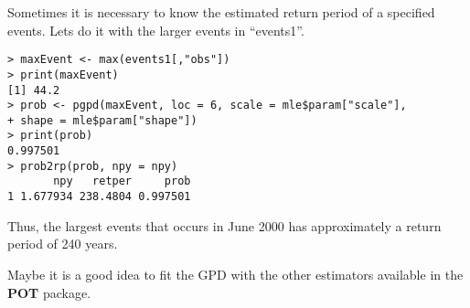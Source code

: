 \documentclass[11pt,a4paper]{article}
\numberwithin{equation}{section}
\begin{document}
Sometimes it is necessary to know the estimated return period of a
specified events. Lets do it with the larger events in ``events1''.
\begin{verbatim}
> maxEvent <- max(events1[,"obs"])
> print(maxEvent)
[1] 44.2
> prob <- pgpd(maxEvent, loc = 6, scale = mle$param["scale"],
+ shape = mle$param["shape"])
> print(prob)
0.997501 
> prob2rp(prob, npy = npy)
       npy   retper     prob
1 1.677934 238.4804 0.997501
\end{verbatim}
Thus, the largest events that occurs in June 2000 has approximately a
return period of 240 years.

Maybe it is a good idea to fit the GPD with the other estimators
available in the \textbf{POT} package.

\end{document}
